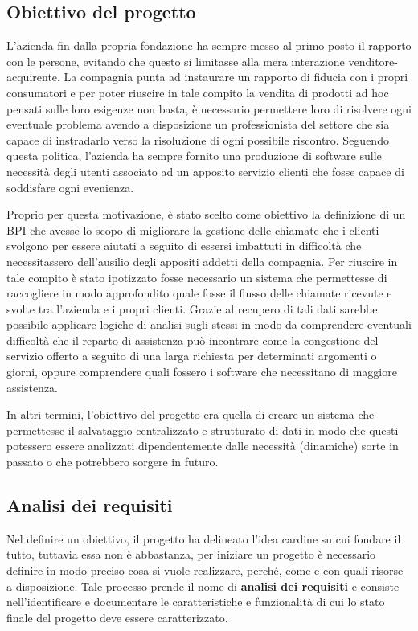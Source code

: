 \subsection{Obiettivo del progetto}

L'azienda fin dalla propria fondazione ha sempre messo al primo posto il rapporto con le persone, evitando che questo si limitasse alla mera interazione venditore-acquirente. La compagnia punta ad instaurare un rapporto di fiducia con i propri consumatori e per poter riuscire in tale compito la vendita di prodotti ad hoc pensati sulle loro esigenze non basta, è necessario permettere loro di risolvere ogni eventuale problema avendo a disposizione un professionista del settore che sia capace di instradarlo verso la risoluzione di ogni possibile riscontro. Seguendo questa politica, l'azienda ha sempre fornito una produzione di software sulle necessità degli utenti associato ad un apposito servizio clienti che fosse capace di soddisfare ogni evenienza.

Proprio per questa motivazione, è stato scelto come obiettivo la definizione di un BPI che avesse lo scopo di migliorare la gestione delle chiamate che i clienti svolgono per essere aiutati a seguito di essersi imbattuti in difficoltà che necessitassero dell'ausilio degli appositi addetti della compagnia. Per riuscire in tale compito è stato ipotizzato fosse necessario un sistema che permettesse di raccogliere in modo approfondito quale fosse il flusso delle chiamate ricevute e svolte tra l'azienda e i propri clienti. Grazie al recupero di tali dati sarebbe possibile applicare logiche di analisi sugli stessi in modo da comprendere eventuali difficoltà che il reparto di assistenza può incontrare come la congestione del servizio offerto a seguito di una larga richiesta per determinati argomenti o giorni, oppure comprendere quali fossero i software che necessitano di maggiore assistenza.

In altri termini, l'obiettivo del progetto era quella di creare un sistema che permettesse il salvataggio centralizzato e strutturato di dati in modo che questi potessero essere analizzati dipendentemente dalle necessità (dinamiche) sorte in passato o che potrebbero sorgere in futuro.

\subsection{Analisi dei requisiti}

Nel definire un obiettivo, il progetto ha delineato l'idea cardine su cui fondare il tutto, tuttavia essa non è abbastanza, per iniziare un progetto è necessario definire in modo preciso cosa si vuole realizzare, perché, come e con quali risorse a disposizione. Tale processo prende il nome di \textbf{analisi dei requisiti} e consiste nell'identificare e documentare le caratteristiche e funzionalità di cui lo stato finale del progetto deve essere caratterizzato.


